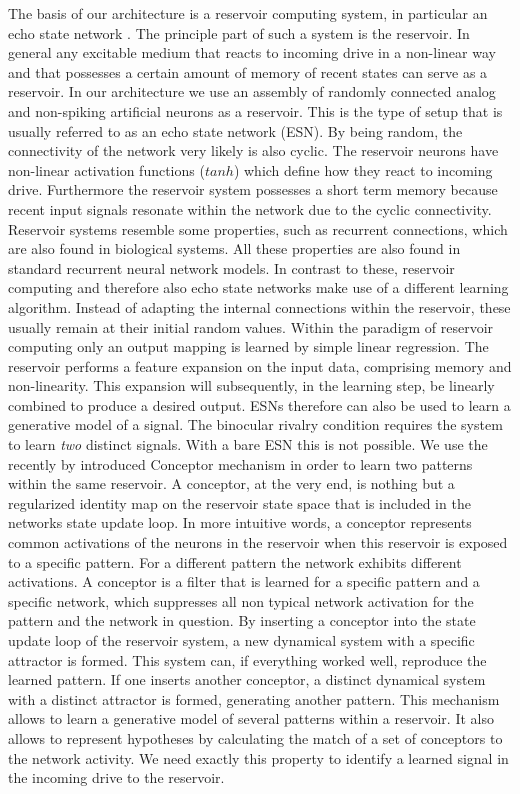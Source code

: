 \documentclass[utf8]{frontiersSCNS} %
\begin{document}
The basis of our architecture is a reservoir computing system, in particular an echo state network \cite{Jaeger2001}. The principle part of such a system is the reservoir. In general any excitable medium that reacts to incoming drive in a non-linear way and that possesses a certain amount of memory of recent states can serve as a reservoir. In our architecture we use an assembly of randomly connected analog and non-spiking artificial neurons as a reservoir. This is the type of setup that is usually referred to as an echo state network (ESN).  By being random, the connectivity of the network very likely is also cyclic. The reservoir neurons have non-linear activation functions ($tanh$) which define how they react to incoming drive. Furthermore the reservoir system possesses a short term memory because recent input signals resonate within the network due to the cyclic connectivity. Reservoir systems resemble some  properties, such as recurrent connections, which are also found in biological systems. All these properties are also found in standard recurrent neural network models. In contrast to these, reservoir computing and therefore also echo state networks make use of a different learning algorithm. Instead of adapting the internal connections within the reservoir, these usually remain at their initial random values. Within the paradigm of reservoir computing only an output mapping is learned by simple linear regression. The reservoir performs a feature expansion on the input data, comprising memory and non-linearity. This expansion will subsequently, in the learning step, be linearly combined to produce a desired output. 
ESNs therefore can also be used to learn a generative model of a signal. The binocular rivalry condition requires the system to learn \textit{two} distinct signals. With a bare ESN this is not possible. We use the recently by  \cite{Jaeger2014} introduced Conceptor mechanism in order to learn two patterns within the same reservoir. A conceptor, at the very end, is nothing but a regularized identity map on the reservoir state space that is included in the networks state update loop. In more intuitive words, a conceptor represents common activations of the neurons in the reservoir when this reservoir is exposed to a specific pattern. For a different pattern the network exhibits different activations. A conceptor is a filter that is learned for a specific pattern and a specific network, which suppresses all non typical network activation for the pattern and the network in question. By inserting a conceptor into the state update loop of the reservoir system, a new dynamical system with a specific attractor is formed. This system can, if everything worked well, reproduce the learned pattern. If one inserts another conceptor, a distinct dynamical system with a distinct attractor is formed, generating another pattern. This mechanism allows to learn a generative model of several patterns within a reservoir. It also allows to represent hypotheses by calculating the match of a set of conceptors to the network activity. We need exactly this property to identify a learned signal in the incoming drive to the reservoir. 
    
\end{document}
